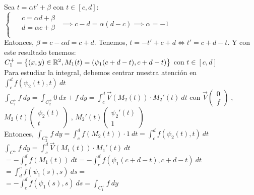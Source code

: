 \documentclass{report}
\begin{document}
    \noindent Sea $t=\alpha t' + \beta$ con $t\in[c,d]\colon$\hspace{0.6cm}
    $\begin{cases}\begin{aligned}
      &c=\alpha d + \beta\\
      &d=\alpha c + \beta\\
    \end{aligned}\end{cases}\implies c-d=\alpha(d-c)\implies\alpha = -1$\\

    \noindent Entonces, $\beta=c-\alpha d = c+d$. Tenemos, $t=-t'+c+d \Leftrightarrow t'=c+d-t$. Y con este resultado tenemos:\\
    $C_1^+=\left\{(x,y)\in\mathbb{R}^2,M_1(t)=\left(\psi_1(c+d-t),c+d-t\right)\right\}$ con $t\in[c,d]$\\

    \noindent Para estudiar la integral, debemos centrar nuestra atención en $\int_c^d f\left(\psi_2(t),t\right)\ dt$\\
    $\int_{C_2^+}f\ dy=\int_{C_2^+}0\ dx+ f\ dy=\int_c^d\vec{V}\left(M_2(t)\right)\cdot M_2'(t)\ dt$
    \hspace{0.3cm}con 
    $\vec{V}\begin{pmatrix} 0          \\ f \end{pmatrix} \;$,
    $M_2(t) \begin{pmatrix} \psi_2(t)  \\ t \end{pmatrix} \;$,
    $M_2'(t)\begin{pmatrix} \psi_2'(t) \\ 1 \end{pmatrix} \;$\\

    \noindent Entonces, $\int_{C_2^+}f\ dy=\int_{c}^{d}f\left(M_2(t)\right)\cdot 1\ dt=\int_{c}^{d}f\left(\psi_2(t),t\right)\ dt$\\
    
    \noindent $\int_{C^+}f\ dy=\int_{c}^{d}\vec{V}\left(M_1(t)\right)\cdot M_1'(t)\ dt$
    $=-\int_{c}^{d}f\left(M_1(t)\right)\ dt=-\int_{c}^{d}f\left(\psi_1(c+d-t),c+d-t\right)\ dt$
    $=\int_{d}^{c}f\left(\psi_1(s),s\right)\ ds=$\\
    $=-\int_{c}^{d}f\left(\psi_1(s),s\right)\ ds=\int_{C_1^+}f\ dy$
    
\end{document}
